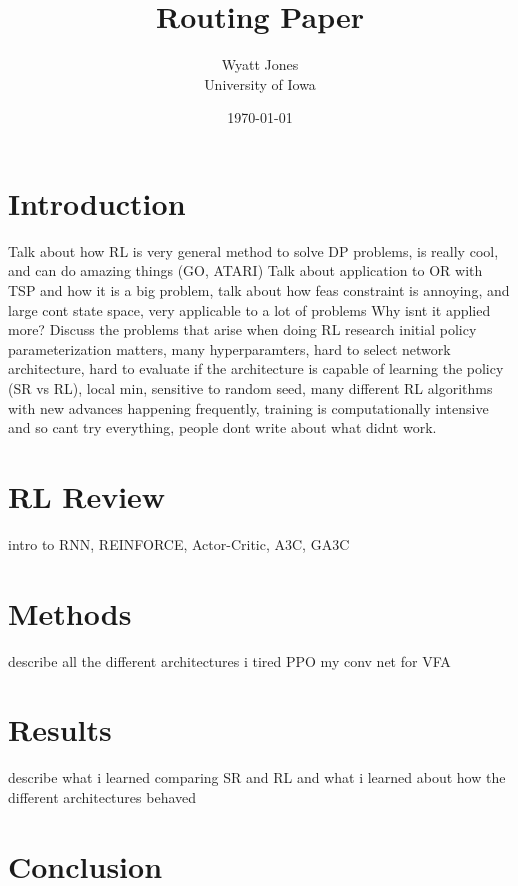 \documentclass[12pt]{article}
\title{Routing Paper}
\author{Wyatt Jones\\University of Iowa}
\date{\today}
\begin{document}
\maketitle


\section{Introduction}
\label{intro}

Talk about how RL is very general method to solve DP problems, is really cool, and can do amazing things (GO, ATARI)
Talk about application to OR with TSP and how it is a big problem, talk about how feas constraint is annoying, and large cont state space, very applicable to a lot of problems
Why isnt it applied more?
Discuss the problems that arise when doing RL research initial policy parameterization matters, many hyperparamters, hard to select network architecture, hard to evaluate if the architecture is capable of learning the policy (SR vs RL), local min, sensitive to random seed, many different RL algorithms with new advances happening frequently, training is computationally intensive and so cant try everything, people dont write about what didnt work.





\section{RL Review}
intro to RNN, REINFORCE, Actor-Critic, A3C, GA3C

\section{Methods}
describe all the different architectures i tired
PPO
my conv net for VFA


\section{Results}
describe what i learned comparing SR and RL and what i learned about how the different architectures behaved

\section{Conclusion}


\citet{2016_Mnih}



\end{document}
